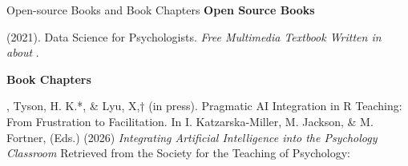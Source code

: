 

\begin{rSection}{\textrm{Open-source Books and Book Chapters}}%
{\large {\bf Open Source Books}}\begin{etaremune}
\item  \meb (2021). Data Science for Psychologists. \textit{Free Multimedia Textbook Written in \R about \R}. 
\end{etaremune}
{\large \bf Book Chapters}
\begin{etaremune}
\item \meb, Tyson, H. K.*, \& Lyu, X,$\dagger$ (in press). Pragmatic AI Integration in R Teaching: From Frustration to Facilitation.  In I. Katzarska-Miller, M. Jackson, \& M. Fortner,  (Eds.) (2026) \textit{Integrating Artificial Intelligence into the Psychology Classroom} Retrieved from the Society for the Teaching of Psychology: \href{https://teachpsych.org/ebooks/index}{\small\color{blue}{teachpsych.org/ebooks/}}
\end{etaremune}
\end{rSection}%
